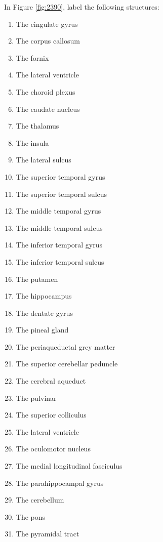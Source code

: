 \documentclass[]{book}
\providecommand{\tightlist}{%
  \setlength{\itemsep}{0pt}\setlength{\parskip}{0pt}}
\begin{document}
In Figure \ref{fig:2390}, label the following structures:

\begin{enumerate}
\def\labelenumi{\arabic{enumi}.}
\tightlist
\item
  The cingulate gyrus
\item
  The corpus callosum
\item
  The fornix
\item
  The lateral ventricle
\item
  The choroid plexus
\item
  The caudate nucleus
\item
  The thalamus
\item
  The insula
\item
  The lateral sulcus
\item
  The superior temporal gyrus
\item
  The superior temporal sulcus
\item
  The middle temporal gyrus
\item
  The middle temporal sulcus
\item
  The inferior temporal gyrus
\item
  The inferior temporal sulcus
\item
  The putamen
\item
  The hippocampus
\item
  The dentate gyrus
\item
  The pineal gland
\item
  The periaqueductal grey matter
\item
  The superior cerebellar peduncle
\item
  The cerebral aqueduct
\item
  The pulvinar
\item
  The superior colliculus
\item
  The lateral ventricle
\item
  The oculomotor nucleus
\item
  The medial longitudinal fasciculus
\item
  The parahippocampal gyrus
\item
  The cerebellum
\item
  The pons
\item
  The pyramidal tract
\end{enumerate}
\end{document}

